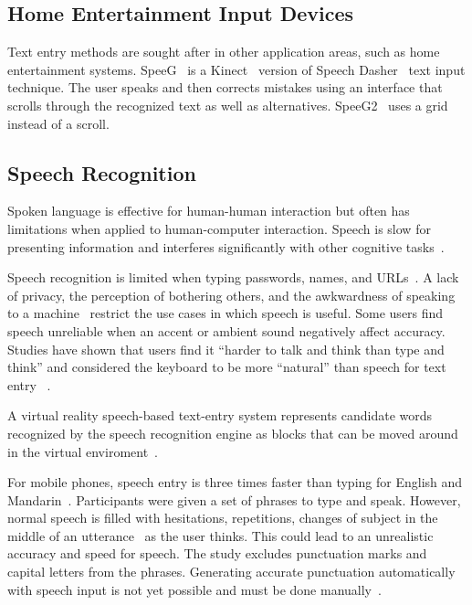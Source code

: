 \subsection{Home Entertainment Input Devices}
Text entry methods are sought after in other application areas, such as home entertainment systems.
SpeeG~\cite{hoste2012speeg} is a Kinect~\cite{geerse2015kinematic} version of Speech Dasher~\cite{vertanen2010speech} text input technique.
The user speaks and then corrects mistakes using an interface that scrolls through the recognized text as well as alternatives.
SpeeG2~\cite{hoste2013speeg2} uses a grid instead of a scroll.

\subsection{Speech Recognition}
Spoken language is effective for human-human interaction but often has limitations when applied to human-computer interaction.
Speech is slow for presenting information and interferes significantly with other cognitive tasks~\cite{shneiderman2000limits}.

Speech recognition is limited when typing passwords, names, and URLs~\cite{bazzi2002modelling}. 
A lack of privacy, the perception of bothering others, and the awkwardness of speaking to a machine~\cite{sawhney2000nomadic} restrict the use cases in which speech is useful.
Some users find speech unreliable when an accent or ambient sound negatively affect accuracy.
Studies have shown that users find it ``harder to talk and think than type and think'' and considered the keyboard to be more ``natural'' than speech for text entry ~\cite{Karat:1999:PEC:302979.303160}.

A virtual reality speech-based text-entry system represents candidate words recognized by the speech recognition engine as blocks that can be moved around in the virtual enviroment~\cite{osawa2002multimodal}. 

For mobile phones, speech entry is three times faster than typing for English and Mandarin~\cite{ruan2016speech}.  
Participants were given a set of phrases to type and speak.
However, normal speech is filled with hesitations, repetitions, changes of subject in the middle of an utterance~\cite{forsberg2003speech} as the user thinks.
This could lead to an unrealistic accuracy and speed for speech.  
The study excludes punctuation marks and capital letters from the phrases.
Generating accurate punctuation  automatically with speech input is not yet possible and must be done manually~\cite{chen1999speech}.

